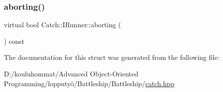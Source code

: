 \subsubsection{\texorpdfstring{aborting()}{aborting()}}
{\footnotesize\ttfamily virtual bool Catch\+::\+I\+Runner\+::aborting (\begin{DoxyParamCaption}{ }\end{DoxyParamCaption}) const\hspace{0.3cm}{\ttfamily [pure virtual]}}



The documentation for this struct was generated from the following file\+:\begin{DoxyCompactItemize}
\item 
D\+:/kouluhommat/\+Advanced Object-\/\+Oriented Programming/lopputyö/\+Battleship/\+Battleship/\mbox{\hyperlink{catch_8hpp}{catch.\+hpp}}\end{DoxyCompactItemize}
